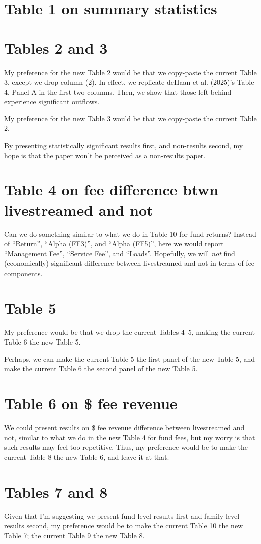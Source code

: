 \documentclass[12pt]{article}
\begin{document}
\section{Table 1 on summary statistics}
\section{Tables 2 and 3}
My preference for the new Table 2 would be that we copy-paste the current Table 3, except we drop column (2). In effect, we replicate deHaan et al. (2025)'s Table 4, Panel A in the first two columns. Then, we show that those left behind experience significant outflows.

My preference for the new Table 3 would be that we copy-paste the current Table 2.

By presenting statistically significant results first, and non-results second, my hope is that the paper won't be perceived as a non-results paper.
\section{Table 4 on fee difference btwn livestreamed and not}
Can we do something similar to what we do in Table 10 for fund returns? Instead of ``Return'', ``Alpha (FF3)'', and ``Alpha (FF5)'', here we would report ``Management Fee'', ``Service Fee'', and ``Loads''. Hopefully, we will \textit{not} find (economically) significant difference between livestreamed and not in terms of fee components.
\section{Table 5}
My preference would be that we drop the current Tables 4--5, making the current Table 6 the new Table 5.

Perhaps, we can make the current Table 5 the first panel of the new Table 5, and make the current Table 6 the second panel of the new Table 5.
\section{Table 6 on \$ fee revenue}
We could present results on \$ fee revenue difference between livestreamed and not, similar to what we do in the new Table 4 for fund fees, but my worry is that such results may feel too repetitive. Thus, my preference would be to make the current Table 8 the new Table 6, and leave it at that.
\section{Tables 7 and 8}
Given that I'm suggesting we present fund-level results first and family-level results second, my preference would be to make the current Table 10 the new Table 7; the current Table 9 the new Table 8.
\end{document}
